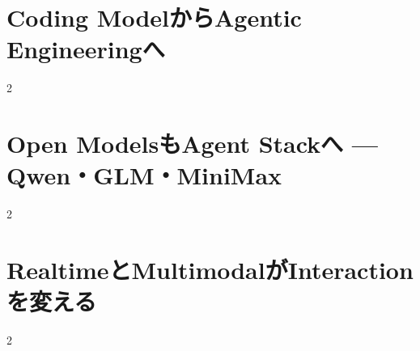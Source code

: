 \documentclass[lualatex,a4paper,11pt]{jlreq}
\begin{document}
\surveycover
\clearpage


\clearpage
\section{Coding ModelからAgentic Engineeringへ}
\label{pkg:agentic-engineering-frontier}
\vspace{0.15em}

\vspace{0.20em}
\begin{multicols}{2}

\end{multicols}

\medskip


\Needspace{0.45\textheight}
\bigskip
\section{Open ModelsもAgent Stackへ — Qwen・GLM・MiniMax}
\label{pkg:open-model-agent-stack}
\vspace{0.15em}

\vspace{0.20em}
\begin{multicols}{2}

\end{multicols}

\medskip


\Needspace{0.45\textheight}
\bigskip
\section{RealtimeとMultimodalがInteractionを変える}
\label{pkg:realtime-multimodal-interaction}
\vspace{0.15em}

\vspace{0.20em}
\begin{multicols}{2}

\end{multicols}

\medskip


\Needspace{0.45\textheight}
\bigskip
\end{document}
